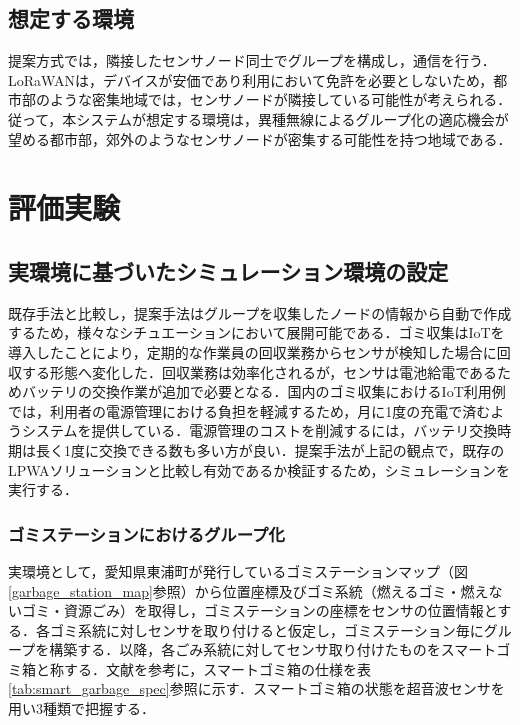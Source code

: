 \documentclass[Japanese]{dicomopapers}
\begin{document}
\subsection{想定する環境}
提案方式では，隣接したセンサノード同士でグループを構成し，通信を行う．LoRaWANは，デバイスが安価であり利用において免許を必要としないため，都市部のような密集地域では，センサノードが隣接している可能性が考えられる．従って，本システムが想定する環境は，異種無線によるグループ化の適応機会が望める都市部，郊外のようなセンサノードが密集する可能性を持つ地域である．

\section{評価実験}
\subsection{実環境に基づいたシミュレーション環境の設定}
既存手法と比較し，提案手法はグループを収集したノードの情報から自動で作成するため，様々なシチュエーションにおいて展開可能である．ゴミ収集はIoTを導入したことにより，定期的な作業員の回収業務からセンサが検知した場合に回収する形態へ変化した．回収業務は効率化されるが，センサは電池給電であるためバッテリの交換作業が追加で必要となる．国内のゴミ収集におけるIoT利用例では，利用者の電源管理における負担を軽減するため，月に1度の充電で済むようシステムを提供している．電源管理のコストを削減するには，バッテリ交換時期は長く1度に交換できる数も多い方が良い．提案手法が上記の観点で，既存のLPWAソリューションと比較し有効であるか検証するため，シミュレーションを実行する．

\subsubsection{ゴミステーションにおけるグループ化}
実環境として，愛知県東浦町が発行しているゴミステーションマップ（図\ref{garbage_station_map}参照）から位置座標及びゴミ系統（燃えるゴミ・燃えないゴミ・資源ごみ）を取得し，ゴミステーションの座標をセンサの位置情報とする．各ゴミ系統に対しセンサを取り付けると仮定し，ゴミステーション毎にグループを構築する．以降，各ごみ系統に対してセンサ取り付けたものをスマートゴミ箱と称する．文献\cite{smart_garbage}を参考に，スマートゴミ箱の仕様を表\ref{tab:smart_garbage_spec}参照に示す．スマートゴミ箱の状態を超音波センサを用い3種類で把握する．
\end{document}
